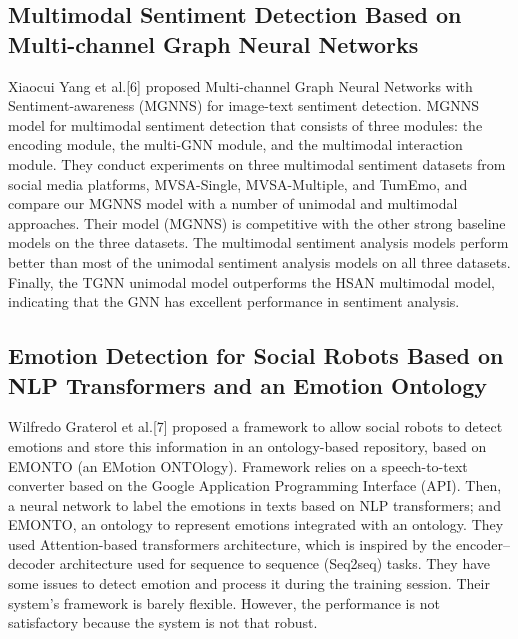 \subsection{Multimodal Sentiment Detection Based on Multi-channel Graph Neural Networks}
Xiaocui Yang et al.[6] proposed Multi-channel Graph Neural Networks with Sentiment-awareness (MGNNS) for image-text sentiment detection. MGNNS model for multimodal sentiment detection that consists of three modules: the encoding module, the multi-GNN module, and the multimodal interaction module. They conduct experiments on three multimodal sentiment datasets from social media platforms, MVSA-Single, MVSA-Multiple, and TumEmo, and compare our MGNNS model with a number of unimodal and multimodal approaches. Their model (MGNNS) is competitive with the other strong baseline models on the three datasets. The multimodal sentiment analysis models perform better than most of the unimodal sentiment analysis models on all three datasets. Finally, the TGNN unimodal model outperforms the HSAN multimodal model, indicating that the GNN has excellent performance in sentiment analysis.

\subsection{Emotion Detection for Social Robots Based on NLP Transformers and an Emotion Ontology}
Wilfredo Graterol et al.[7] proposed a framework to allow social robots to detect emotions and store this information in an ontology-based repository, based on EMONTO (an EMotion ONTOlogy). Framework relies on a speech-to-text converter based on the Google Application Programming Interface (API). Then, a neural network to label the emotions in texts based on NLP transformers; and EMONTO, an ontology to represent emotions integrated with an ontology. They used Attention-based transformers architecture, which is inspired by the encoder–decoder architecture used for sequence to sequence (Seq2seq) tasks. They have some issues to detect emotion and process it during the training session. Their system's framework is barely flexible. However, the performance is not satisfactory because the system is not that robust.

